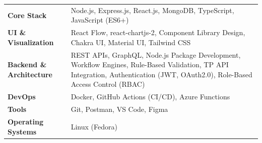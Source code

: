 \documentclass[10pt,a4paper]{moderncv}
\begin{document}
\begin{tabularx}{\textwidth}{>{\bfseries}l@{\hskip 3mm}X}
Core Stack & Node.js, Express.js, React.js, MongoDB, TypeScript, JavaScript (ES6+) \\
UI \& Visualization & React Flow, react-chartjs-2, Component Library Design, Chakra UI, Material UI, Tailwind CSS \\
Backend \& Architecture & REST APIs, GraphQL, Node.js Package Development, Workflow Engines, Rule-Based Validation, TP API Integration, Authentication (JWT, OAuth2.0), Role-Based Access Control (RBAC) \\
DevOps & Docker, GitHub Actions (CI/CD), Azure Functions \\
Tools & Git, Postman, VS Code, Figma \\
Operating Systems & Linux (Fedora) \\
\end{tabularx}
\end{document}
